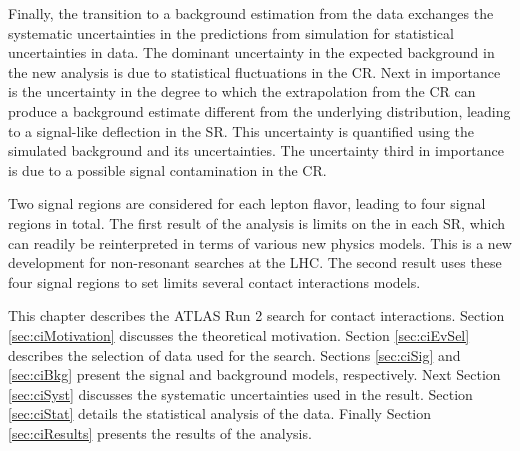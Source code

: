 Finally, the transition to a background estimation from the data exchanges the systematic uncertainties in the predictions from simulation for statistical uncertainties in data.
The dominant uncertainty in the expected background in the new analysis is due to statistical fluctuations in the CR.
Next in importance is the uncertainty in the degree to which the extrapolation from the CR can produce a background estimate different from the underlying distribution, leading to a signal-like deflection in the SR. This uncertainty is quantified using the simulated background and its uncertainties.
The uncertainty third in importance is due to a possible signal contamination in the CR.

Two signal regions are considered for each lepton flavor, leading to four signal regions in total.
The first result of the analysis is limits on the \xsbr in each SR, which can readily be reinterpreted in terms of various new physics models.
This is a new development for non-resonant searches at the LHC.
The second result uses these four signal regions to set limits several contact interactions models.

This chapter describes the ATLAS Run 2 search for contact interactions.
Section \ref{sec:ciMotivation} discusses the theoretical motivation.
Section \ref{sec:ciEvSel} describes the selection of data used for the search.
Sections \ref{sec:ciSig} and \ref{sec:ciBkg} present the signal and background models, respectively.
Next Section \ref{sec:ciSyst} discusses the systematic uncertainties used in the result.
Section \ref{sec:ciStat} details the statistical analysis of the data.
Finally Section \ref{sec:ciResults} presents the results of the analysis.











